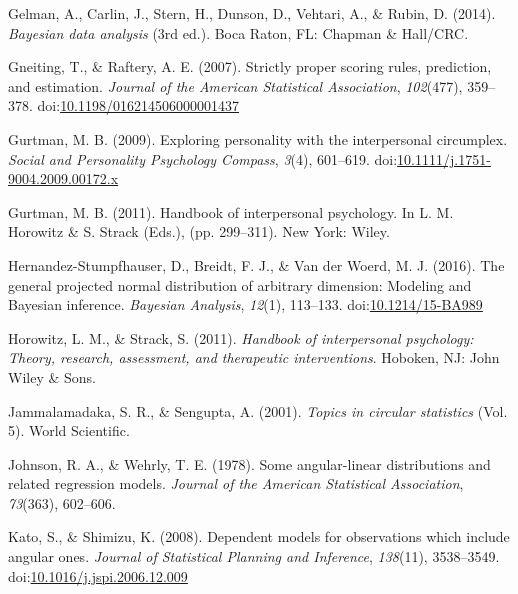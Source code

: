 \documentclass[man,mask]{apa6}
\DeclareRobustCommand{\VANDER}[3]{#2}
\begin{document}
\leavevmode\hypertarget{ref-BDA}{}%
Gelman, A., Carlin, J., Stern, H., Dunson, D., Vehtari, A., \& Rubin, D. (2014). \emph{Bayesian data analysis} (3rd ed.). Boca Raton, FL: Chapman \& Hall/CRC.

\leavevmode\hypertarget{ref-gneiting2007strictly}{}%
Gneiting, T., \& Raftery, A. E. (2007). Strictly proper scoring rules, prediction, and estimation. \emph{Journal of the American Statistical Association}, \emph{102}(477), 359--378. doi:\href{https://doi.org/10.1198/016214506000001437}{10.1198/016214506000001437}

\leavevmode\hypertarget{ref-gurtman2009exploring}{}%
Gurtman, M. B. (2009). Exploring personality with the interpersonal circumplex. \emph{Social and Personality Psychology Compass}, \emph{3}(4), 601--619. doi:\href{https://doi.org/10.1111/j.1751-9004.2009.00172.x}{10.1111/j.1751-9004.2009.00172.x}

\leavevmode\hypertarget{ref-gurtman2011reasoning}{}%
Gurtman, M. B. (2011). Handbook of interpersonal psychology. In L. M. Horowitz \& S. Strack (Eds.), (pp. 299--311). New York: Wiley.

\leavevmode\hypertarget{ref-hernandez2016general}{}%
Hernandez-Stumpfhauser, D., Breidt, F. J., \& \VANDER{Woerd}{Van der}{van der} Woerd, M. J. (2016). The general projected normal distribution of arbitrary dimension: Modeling and Bayesian inference. \emph{Bayesian Analysis}, \emph{12}(1), 113--133. doi:\href{https://doi.org/10.1214/15-BA989}{10.1214/15-BA989}

\leavevmode\hypertarget{ref-horowitz2010handbook}{}%
Horowitz, L. M., \& Strack, S. (2011). \emph{Handbook of interpersonal psychology: Theory, research, assessment, and therapeutic interventions}. Hoboken, NJ: John Wiley \& Sons.

\leavevmode\hypertarget{ref-jammalamadaka2001topics}{}%
Jammalamadaka, S. R., \& Sengupta, A. (2001). \emph{Topics in circular statistics} (Vol. 5). World Scientific.

\leavevmode\hypertarget{ref-johnson1978some}{}%
Johnson, R. A., \& Wehrly, T. E. (1978). Some angular-linear distributions and related regression models. \emph{Journal of the American Statistical Association}, \emph{73}(363), 602--606.

\leavevmode\hypertarget{ref-kato2008dependent}{}%
Kato, S., \& Shimizu, K. (2008). Dependent models for observations which include angular ones. \emph{Journal of Statistical Planning and Inference}, \emph{138}(11), 3538--3549. doi:\href{https://doi.org/10.1016/j.jspi.2006.12.009}{10.1016/j.jspi.2006.12.009}
\end{document}
